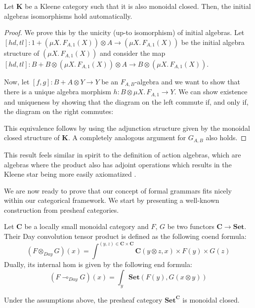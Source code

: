 \documentclass[sigconf,anonymous,review,screen]{acmart}
\newcommand{\cat}[1]{\mathbf{#1}}
\newcommand{\lto}{\multimap}
\newcommand{\Set}{\mathbf{Set}}
\begin{document}
\begin{theorem}
  \label{th:kleeneclosed}
  Let $\cat{K}$ be a Kleene category such that it is also monoidal
  closed.  Then, the initial algebras isomorphisms hold automatically.
\end{theorem}
\begin{proof}
  We prove this by the unicity (up-to isomorphism) of initial
  algebras. Let $[hd, tl]: 1 + (\mu X.\, F_{A, 1}(X)) \otimes A \to
  (\mu X.\, F_{A, 1}(X))$ be the initial algebra structure of $(\mu
  X.\, F_{A, 1}(X))$ and consider the map $[hd, tl] : B + B \otimes
  (\mu X.\, F_{A, 1}(X)) \otimes A \to B\otimes (\mu X.\, F_{A,
    1}(X))$.

  Now, let $[f,g] : B + A \otimes Y \to Y$ be an $F_{A,B}$-algebra and
  we want to show that there is a unique algebra morphism $h : B
  \otimes \mu X.\, F_{A,1} \to Y$. We can show existence and uniqueness
  by showing that the diagram on the left commute if, and only if,
  the diagram on the right commutes:

  This equivalence follows by using the adjunction structure given
  by the monoidal closed structure of $\cat{K}$. A completely analogous
  argument for $G_{A,B}$ also holds.
\end{proof}

This result feels similar in spirit to the definition of action
algebras, which are algebras where the product also has adjoint
operations which results in the Kleene star being more easily
axiomatized \cite{kozen1994}.

We are now ready to prove that our concept of formal grammars fits
nicely within our categorical framework. We start by presenting a
well-known construction from presheaf categories.

\begin{definition}
  Let $\cat{C}$ be a locally small monoidal category and $F$, $G$ be
  two functors $\cat{C} \to \Set$. Their Day convolution tensor
  product is defined as the following coend formula:
  \[
  (F \otimes_{Day} G)(x) = \int^{(y,z) \in \cat{C}\times\cat{C}}\cat{C}(y\otimes z, x) \times F(y) \times G(z) 
  \]
  Dually, its internal hom is given by the following end formula:
  \[
  (F \lto_{Day} G)(x) = \int_{y} \Set(F(y), G(x \otimes y))
  \]
\end{definition}

\begin{lemma}
  Under the assumptions above, the presheaf category $\Set^{\cat{C}}$ is
  monoidal closed.
\end{lemma}
\end{document}
